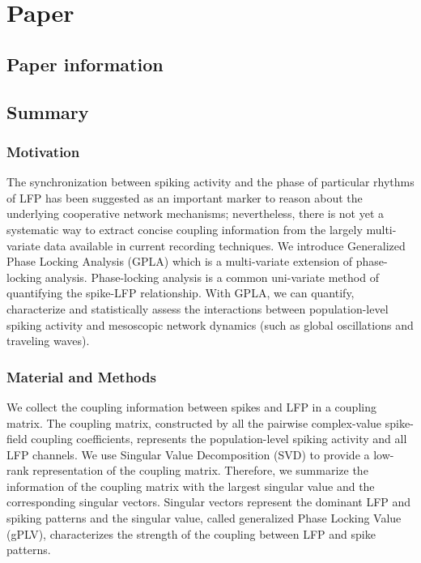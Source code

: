 \chapter{Paper }\label{cha:paper-gpla}
\section*{Paper information} %


\section*{Summary} %
\subsection*{Motivation}

The synchronization between spiking activity and the phase of particular rhythms of LFP has been suggested as an important marker to reason about the underlying cooperative network mechanisms; 
nevertheless, there is not yet a systematic way to extract concise coupling information from the largely multi-variate data available in current recording techniques.
We introduce Generalized Phase Locking Analysis (GPLA) which is a multi-variate extension of phase-locking analysis.
Phase-locking analysis is a common uni-variate method of quantifying the spike-LFP relationship.
With GPLA, we can quantify, characterize and statistically assess the interactions between pop\-ulation-level spiking activity and mesoscopic network dynamics
(such as global oscillations and traveling waves).


\subsection*{Material and Methods}

We collect the coupling information between spikes and LFP in a coupling matrix.
The coupling matrix, constructed by all the pairwise complex-value spike-field coupling coefficients, 
represents the population-level spiking activity and all LFP channels.
We use Singular Value Decomposition (SVD) to provide a low-rank representation of the coupling matrix.
Therefore, we summarize the information of the coupling matrix with the largest singular value and the corresponding singular vectors. 
Singular vectors represent the dominant LFP and spiking patterns and the singular value, called generalized Phase Locking Value (gPLV), characterizes the strength of the coupling between LFP and spike patterns.

